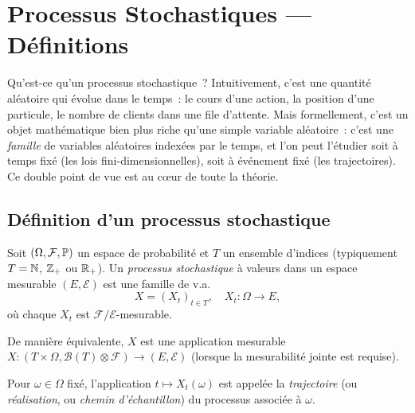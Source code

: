 \chapter{Processus Stochastiques --- D\'efinitions}
\label{ch:definitions}

Qu'est-ce qu'un processus stochastique~? Intuitivement, c'est une quantit\'e
al\'eatoire qui \'evolue dans le temps~: le cours d'une action, la position
d'une particule, le nombre de clients dans une file d'attente. Mais
formellement, c'est un objet math\'ematique bien plus riche qu'une simple
variable al\'eatoire~: c'est une \emph{famille} de variables al\'eatoires
index\'ees par le temps, et l'on peut l'\'etudier soit \og \`a temps fix\'e\fg{}
(les lois fini-dimensionnelles), soit \og \`a \'ev\'enement fix\'e\fg{} (les
trajectoires). Ce double point de vue est au c\oe ur de toute la th\'eorie.

\section{D\'efinition d'un processus stochastique}

\begin{definition}
Soit $(\Omega, \mathcal{F}, \mathbb{P})$ un espace de probabilit\'e et $T$ un ensemble
d'indices (typiquement $T = \mathbb{N}$, $\mathbb{Z}_+$ ou $\mathbb{R}_+$). Un \emph{processus stochastique}
\`a valeurs dans un espace mesurable $(E, \mathcal{E})$ est une famille de v.a.\
\[
  X = (X_t)_{t \in T}, \quad X_t : \Omega \to E,
\]
o\`u chaque $X_t$ est $\mathcal{F}/\mathcal{E}$-mesurable.

De mani\`ere \'equivalente, $X$ est une application mesurable
$X : (T \times \Omega, \mathcal{B}(T) \otimes \mathcal{F}) \to (E, \mathcal{E})$
(lorsque la mesurabilit\'e jointe est requise).
\end{definition}

\begin{definition}[Trajectoire]
Pour $\omega \in \Omega$ fix\'e, l'application $t \mapsto X_t(\omega)$ est appel\'ee
la \emph{trajectoire} (ou \emph{r\'ealisation}, ou \emph{chemin d'\'echantillon})
du processus associ\'ee \`a $\omega$.
\end{definition}

